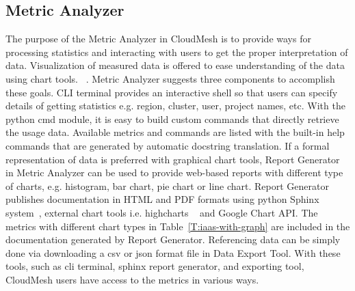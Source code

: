 \documentclass{tex/sig-alternate}
\begin{document}
{\subsection{Metric Analyzer}

The purpose of the Metric Analyzer in CloudMesh is to provide ways for processing statistics and interacting with users to get the proper interpretation of data. Visualization of measured data is offered to ease understanding of the data using chart tools. ~\cite{kosslyn1989understanding,pinker1990theory,friel2001making}. Metric Analyzer suggests three components to accomplish these goals. CLI terminal provides an interactive shell so that users can specify details of getting statistics e.g. region, cluster, user, project names, etc. With the python cmd module, it is easy to build custom commands that directly retrieve the usage data. Available metrics and commands are listed with the built-in help commands that are generated by automatic docstring translation. If a formal representation of data is preferred with graphical chart tools, Report Generator in Metric Analyzer can be used to provide web-based reports with different type of charts, e.g. histogram, bar chart, pie chart or line chart. Report Generator publishes documentation in HTML and PDF formats using python Sphinx system~\cite{brandl2009sphinx}, external chart tools i.e. highcharts ~\cite{highsoft2012highcharts} and Google Chart API. The metrics with different chart types in Table~\ref{T:iaas-with-graph} are included in the documentation generated by Report Generator. Referencing data can be simply done via downloading a csv or json format file in Data Export Tool. With these tools, such as cli terminal, sphinx report generator, and exporting tool, CloudMesh users have access to the metrics in various ways.


}
\end{document}

